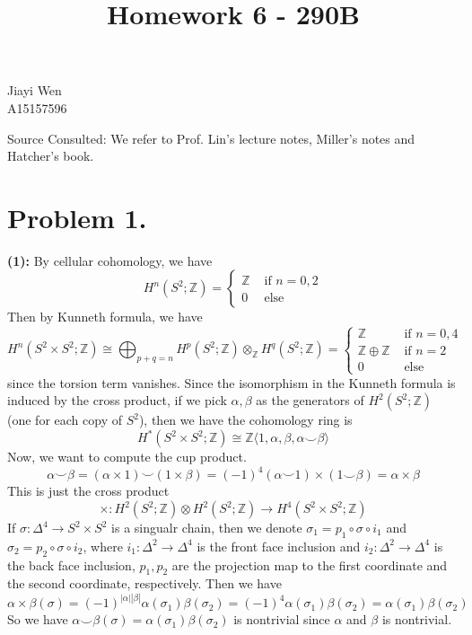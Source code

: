 \documentclass[12pt]{amsart}
\newcommand{\Z}{\mathbb{Z}}
\newcommand{\If}{\text{ if }}
\newcommand{\Else}{\text{ else}}
\begin{document}
\title{Homework 6 - 290B}
\maketitle
\begin{center}
    Jiayi Wen\\
    A15157596
\end{center}
Source Consulted: We refer to Prof. Lin's lecture notes, Miller's notes and Hatcher's book. \\
\section*{Problem 1.}
\textbf{(1):} By cellular cohomology, we have
\[H^n(S^2;\Z)=\begin{cases}
        \Z & \If n=0,2 \\
        0  & \Else
    \end{cases}\]
Then by Kunneth formula, we have
\[H^n(S^2\times S^2;\Z )\cong \bigoplus_{p+q=n}H^p(S^2;\Z)\otimes_\Z  H^q(S^2;\Z )=\begin{cases}
        \Z          & \If n=0,4 \\
        \Z\oplus \Z & \If n=2   \\
        0           & \Else
    \end{cases}\]
since the torsion term vanishes. Since the isomorphism in the Kunneth formula is induced by the cross product, if we pick $\alpha,\beta$ as the generators of $H^2(S^2;\Z)$ (one for each copy of $S^2$), then we have the cohomology ring is
\[H^\ast(S^2\times S^2;\Z)\cong \Z\langle 1,\alpha,\beta,\alpha\smile \beta\rangle\]
Now, we want to compute the cup product.
$$\alpha\smile\beta=(\alpha\times 1)\smile(1\times \beta)=(-1)^4(\alpha\smile 1)\times (1\smile \beta)=\alpha\times \beta$$
This is just the cross product
\[\times : H^2(S^2;\Z)\otimes H^2(S^2;\Z)\to H^4(S^2\times S^2;\Z)\]
If $\sigma:\Delta^4\to S^2\times S^2$ is a singualr chain, then we denote $\sigma_1=p_1\circ \sigma\circ i_1$ and $\sigma_2=p_2\circ \sigma\circ i_2$, where $i_1:\Delta^2\to \Delta^4$ is the front face inclusion and $i_2:\Delta^2\to \Delta^4$ is the back face inclusion, $p_1,p_2$ are the projection map to the first coordinate and the second coordinate, respectively. Then we have
\[\alpha\times \beta(\sigma)=(-1)^{|\alpha||\beta|}\alpha(\sigma_1)\beta(\sigma_2)=(-1)^4\alpha(\sigma_1)\beta(\sigma_2)=\alpha(\sigma_1)\beta(\sigma_2)\]
So we have $\alpha\smile\beta(\sigma)=\alpha(\sigma_1)\beta(\sigma_2)$ is nontrivial since $\alpha$ and $\beta$ is nontrivial.
\end{document}
